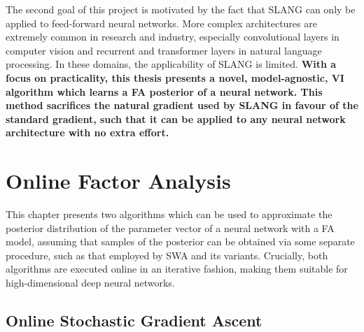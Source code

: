 \documentclass[msc,deptreport.inf]{infthesis} %
\begin{document}
The second goal of this project is motivated by the fact that SLANG can only be applied to feed-forward neural networks. More complex architectures are extremely common in research and industry, especially convolutional layers \cite{krizhevsky09} in computer vision and recurrent \cite{hochreiter1997} and transformer \cite{vaswani2017} layers in natural language processing. In these domains, the applicability of SLANG is limited. \textbf{With a focus on practicality, this thesis presents a novel, model-agnostic, VI algorithm which learns a FA posterior of a neural network. This method sacrifices the natural gradient used by SLANG in favour of the standard gradient, such that it can be applied to any neural network architecture with no extra effort.} 


\chapter{Online Factor Analysis}\label{ch:online_fa}

This chapter presents two algorithms which can be used to approximate the posterior distribution of the parameter vector of a neural network with a FA model, assuming that samples of the posterior can be obtained via some separate procedure, such as that employed by SWA and its variants. Crucially, both algorithms are executed online in an iterative fashion, making them suitable for high-dimensional deep neural networks.

\section{Online Stochastic Gradient Ascent}\label{sec:gradient_fa}
\end{document}
